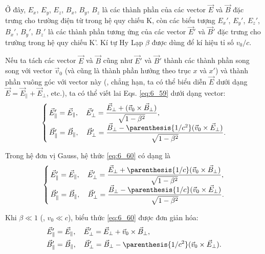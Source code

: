 Ở đây, $E_x$, $E_y$, $E_z$, $B_x$, $B_y$, $B_z$ là các thành phần của các vector $\vec{E}$ và $\vec{B}$ đặc trưng cho trường điện từ trong hệ quy chiếu K, còn các biểu tượng $E_x'$, $E_y'$, $E_z'$, $B_x'$, $B_y'$, $B_z'$ là các thành phần tương ứng của các vector $\vec{E}'$ và $\vec{B}'$ đặc trưng cho trường trong hệ quy chiếu K'. Kí tự Hy Lạp $\beta$ được dùng để kí hiệu tỉ số $v_0/c$.

Nếu ta tách các vector $\vec{E}$ và $\vec{B}$ cũng như $\vec{E}'$ và $\vec{B}'$ thành các thành phần song song với vector $\vec{v}_0$ (và cũng là thành phần hướng theo trục $x$ và $x'$) và thành phần vuông góc với vector này (\ie, chẳng hạn, ta có thể biểu diễn $\vec{E}$ dưới dạng $\vec{E}=\vec{E}_{\parallel}+\vec{E}_{\perp}$, etc.), ta có thể viết lai Eqs. \eqref{eq:6_59} dưới dạng vector:
\begin{equation}\label{eq:6_60}
    \begin{cases}
        & \!\!\!\!\! \vec{E}_{\parallel}' = \vec{E}_{\parallel},\quad \vec{E}_{\perp}' = \dfrac{\vec{E}_{\perp} + (\vec{v}_0 \times \vec{B}_{\perp})}{\sqrt{1-\beta^2}},\\
        & \!\!\!\!\! \vec{B}_{\parallel}' = \vec{B}_{\parallel},\quad \vec{B}_{\perp}' = \dfrac{\vec{B}_{\perp}- \parenthesis{1/c^2} (\vec{v}_0 \times \vec{E}_{\perp})}{\sqrt{1-\beta^2}}.
    \end{cases}
\end{equation}

\noindent
Trong hệ đơn vị Gauss, hệ thức \eqref{eq:6_60} có dạng là
\begin{equation}\label{eq:6_61}
    \begin{cases}
        & \!\!\!\!\! \vec{E}_{\parallel}' = \vec{E}_{\parallel},\quad \vec{E}_{\perp}' = \dfrac{\vec{E}_{\perp} + \parenthesis{1/c} (\vec{v}_0 \times \vec{B}_{\perp})}{\sqrt{1-\beta^2}},\\
        & \!\!\!\!\! \vec{B}_{\parallel}' = \vec{B}_{\parallel},\quad \vec{B}_{\perp}' = \dfrac{\vec{B}_{\perp}- \parenthesis{1/c} (\vec{v}_0 \times \vec{E}_{\perp})}{\sqrt{1-\beta^2}}.
    \end{cases}
\end{equation}

\noindent
Khi $\beta\ll 1$ (\ie, $v_0\ll c$), biểu thức \eqref{eq:6_60} được đơn giản hóa:
\begin{align*}
    \vec{E}_{\parallel}' &= \vec{E}_{\parallel},\quad \vec{E}_{\perp}' = \vec{E}_{\perp} + \vec{v}_0 \times \vec{B}_{\perp},\\
    \vec{B}_{\parallel}' &= \vec{B}_{\parallel},\quad \vec{B}_{\perp}' = \vec{B}_{\perp}-\parenthesis{1/c^2} (\vec{v}_0 \times \vec{E}_{\perp}).
\end{align*}

